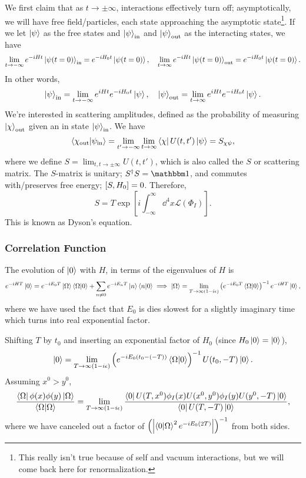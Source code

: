 \documentclass{article}
\begin{document}
We first claim that as $t\to\pm\infty$, interactions effectively turn off; asymptotically, we will have free field/particles, each state approaching the asymptotic state\footnote{This really isn't true because of self and vacuum interactions, but we will come back here for renormalization.}. If we let $\ket\psi$ as the free states and $\ket\psi_\text{in}$ and $\ket\psi_\text{out}$ as the interacting states, we have 
$$\lim_{t\to-\infty}e^{-iHt}\ket{\psi(t=0)}_\text{in}=e^{-iH_0t}\ket{\psi(t=0)},\quad \lim_{t\to\infty}e^{-iHt}\ket{\psi(t=0)}_\text{out}=e^{-iH_0t}\ket{\psi(t=0)}.$$
In other words, 
$$\ket\psi_\text{in}=\lim_{t\to-\infty}e^{iHt}e^{-iH_0t}\ket\psi,\quad\ket\psi_\text{out}=\lim_{t\to\infty}e^{iHt}e^{-iH_0t}\ket\psi.$$
We're interested in scattering amplitudes, defined as the probability of measuring $\ket\chi_\text{out}$ given an in state $\ket\psi_\text{in}$. We have 
$$\braket{\chi_\text{out}}{\psi_\text{in}}=\lim_{t'\to-\infty}\lim_{t\to\infty}\bra\chi U(t,t')\ket\psi=S_{\chi\psi},$$
where we define $S=\lim_{t,t\to\pm\infty}U(t,t')$, which is also called the $S$ or scattering matrix. The $S$-matrix is unitary; $S^\dag S=\mathbbm 1$, and commutes with/preserves free energy; $\comm{S}{H_0}=0$. Therefore, 
\begin{equation}
    S=T\exp\left[i\int^\infty_{-\infty}\dd^4x\mathcal L(\Phi_I)\right].
\end{equation}
This is known as Dyson's equation. 

\subsubsection{Correlation Function}

The evolution of $\ket 0$ with $H$, in terms of the eigenvalues of $H$ is 
$$e^{-iHT}\ket 0=e^{-iE_0T}\ket\Omega\braket{\Omega}{0}+\sum_{n\ne 0}e^{-iE_nT}\ket n\braket{n}{0}\implies\ket\Omega=\lim_{T\to\infty(1-i\epsilon)}\left(e^{-iE_0T}\braket{\Omega}{0}\right)^{-1}e^{-iHT}\ket 0,$$
where we have used the fact that $E_0$ is dies slowest for a slightly imaginary time which turns into real exponential factor. 

Shifting $T$ by $t_0$ and inserting an exponential factor of $H_0$ (since $H_0\ket 0=\ket 0$), 
$$\ket 0=\lim_{T\to\infty(1-i\epsilon)}\left(e^{-iE_0(t_0-(-T))}\braket{\Omega}{0}\right)^{-1}U(t_0,-T)\ket 0.$$
Assuming $x^0>y^0$, 
$$\frac{\bra\Omega\phi(x)\phi(y)\ket\Omega}{\braket{\Omega}{\Omega}}=\lim_{T\to\infty(1-i\epsilon)}\frac{\bra 0U(T,x^0)\phi_I(x)U(x^0,y^0)\phi_I(y)U(y^0,-T)\ket 0}{\bra 0U(T,-T)\ket 0},$$
where we have canceled out a factor of $\left(\left\lvert\braket{0}{\Omega}^2e^{-iE_0(2T)}\right\rvert\right)^{-1}$ from both sides.
\end{document}
